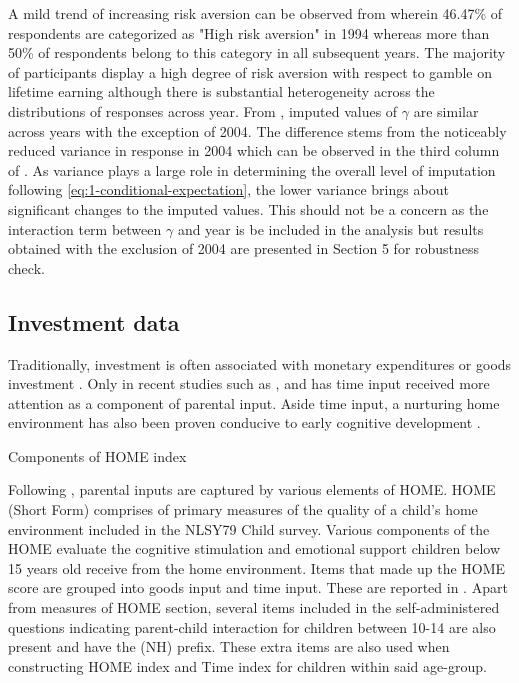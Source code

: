 \documentclass[]{article}
\begin{document}
A mild trend of increasing risk aversion can be observed from  wherein 46.47\% of respondents are categorized as "High risk aversion" in 1994 whereas more than 50\% of respondents belong to this category in all subsequent years. The majority of participants display a high degree of risk aversion with respect to gamble on lifetime earning although there is substantial heterogeneity across the distributions of responses across year. From , imputed values of $\gamma$ are similar across years with the exception of 2004. The difference stems from the noticeably reduced variance in response in 2004 which can be observed in the third column of . As variance plays a large role in determining the overall level of imputation following \eqref{eq:1-conditional-expectation}, the lower variance brings about significant changes to the imputed values. This should not be a concern as the interaction term between $\gamma$ and year is be included in the analysis but results obtained with the exclusion of 2004 are presented in Section 5 for robustness check.











\subsection{Investment data}
Traditionally, investment is often associated with monetary expenditures or goods investment \citep{heckman2014economics}. Only in recent studies such as \citet{carneiro2016partial}, \citet{bono2016early} and \citet{del2016transfers} has time input received more attention as a component of parental input. Aside time input, a nurturing home environment has also been proven conducive to early cognitive development \citep{altman2013home, iverson1982home}. 

\begin{table}[!t]
	\centering
	\setlength{\extrarowheight}{0.2em}
	\caption{Components of HOME index}	
	
	\label{table:4-HOME}
\end{table} 

Following \citet{carneiro2016partial}, parental inputs are captured by various elements of HOME. HOME (Short Form) comprises of primary measures of the quality of a child's home environment included in the NLSY79 Child survey. Various components of the HOME evaluate the cognitive stimulation and emotional support children below 15 years old receive from the home environment. Items that made up the HOME score are grouped into goods input and time input. These are reported in . Apart from measures of HOME section, several items included in the self-administered questions indicating parent-child interaction for children between 10-14 are also present and have the (NH) prefix. These extra items are also used when constructing HOME index and Time index for children within said age-group.  
 
\end{document}
